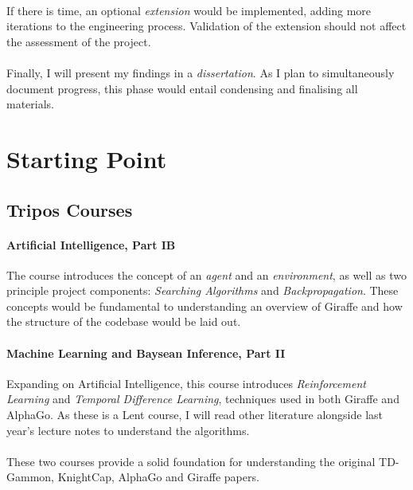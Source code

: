 \documentclass[a4paper]{article}
\begin{document}
\paragraph{}If there is time, an optional \textit{extension} would be implemented, adding more iterations to the engineering process. Validation of the extension should not affect the assessment of the project.

\paragraph{}Finally, I will present my findings in a \textit{dissertation}. As I plan to simultaneously document progress, this phase would entail condensing and finalising all materials.


\section*{Starting Point}

\subsection*{Tripos Courses}

\paragraph{Artificial Intelligence, Part IB} The course introduces the concept of an \textit{agent} and an \textit{environment}, as well as two principle project components: \textit{Searching Algorithms} and \textit{Backpropagation}. These concepts would be fundamental to understanding an overview of Giraffe and how the structure of the codebase would be laid out.

\paragraph{Machine Learning and Baysean Inference, Part II} Expanding on Artificial Intelligence, this course introduces \textit{Reinforcement Learning} and \textit{Temporal Difference Learning}, techniques used in both Giraffe and AlphaGo. As these is a Lent course, I will read other literature alongside last year's lecture notes to understand the algorithms.

\paragraph{} These two courses provide a solid foundation for understanding the original TD-Gammon, KnightCap, AlphaGo and Giraffe papers.
\end{document}
